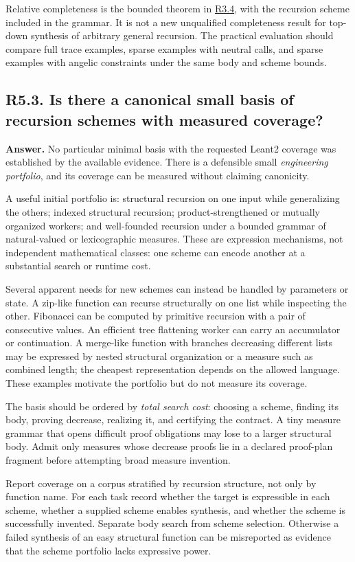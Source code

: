 \documentclass[11pt,a4paper]{article}
\newcommand{\question}[2]{\subsection{#1. #2}\label{q:#1}}
\newcommand{\qref}[1]{\hyperref[q:#1]{#1}}
\theoremstyle{definition}
\theoremstyle{remark}
\begin{document}
Relative completeness is the bounded theorem in \qref{R3.4}, with the recursion scheme included in the grammar. It is not a new unqualified completeness result for top-down synthesis of arbitrary general recursion. The practical evaluation should compare full trace examples, sparse examples with neutral calls, and sparse examples with angelic constraints under the same body and scheme bounds.

\question{R5.3}{Is there a canonical small basis of recursion schemes with measured coverage?}

\textbf{Answer.} No particular minimal basis with the requested Leant2 coverage was established by the available evidence. There is a defensible small \emph{engineering portfolio}, and its coverage can be measured without claiming canonicity.

A useful initial portfolio is: structural recursion on one input while generalizing the others; indexed structural recursion; product-strengthened or mutually organized workers; and well-founded recursion under a bounded grammar of natural-valued or lexicographic measures. These are expression mechanisms, not independent mathematical classes: one scheme can encode another at a substantial search or runtime cost.

Several apparent needs for new schemes can instead be handled by parameters or state. A zip-like function can recurse structurally on one list while inspecting the other. Fibonacci can be computed by primitive recursion with a pair of consecutive values. An efficient tree flattening worker can carry an accumulator or continuation. A merge-like function with branches decreasing different lists may be expressed by nested structural organization or a measure such as combined length; the cheapest representation depends on the allowed language. These examples motivate the portfolio but do not measure its coverage.

The basis should be ordered by \emph{total search cost}: choosing a scheme, finding its body, proving decrease, realizing it, and certifying the contract. A tiny measure grammar that opens difficult proof obligations may lose to a larger structural body. Admit only measures whose decrease proofs lie in a declared proof-plan fragment before attempting broad measure invention.

Report coverage on a corpus stratified by recursion structure, not only by function name. For each task record whether the target is expressible in each scheme, whether a supplied scheme enables synthesis, and whether the scheme is successfully invented. Separate body search from scheme selection. Otherwise a failed synthesis of an easy structural function can be misreported as evidence that the scheme portfolio lacks expressive power.
\end{document}
